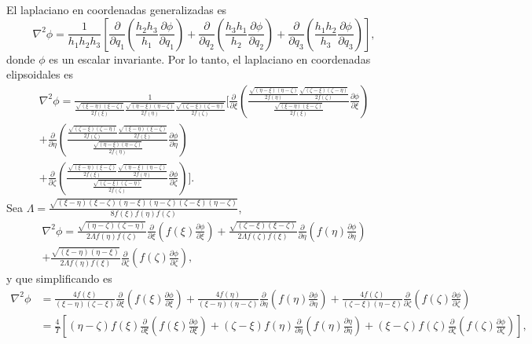 \documentclass[paper=letter, fontsize=12pt,]{article}
\begin{document}
El laplaciano en coordenadas generalizadas es \cite{Arfken}
\begin{equation}
    \nabla^2\phi=\frac{1}{h_1h_2h_3}\left[\frac{\partial}{\partial q_1}\left(\frac{h_2h_3}{h_1}\frac{\partial\phi}{\partial q_1}\right)+\frac{\partial}{\partial q_2}\left(\frac{h_3h_1}{h_2}\frac{\partial\phi}{\partial q_2}\right)+\frac{\partial}{\partial q_3}\left(\frac{h_1h_2}{h_3}\frac{\partial\phi}{\partial q_3}\right)\right],    
\end{equation}
donde $\phi$ es un escalar invariante. Por lo tanto, el laplaciano en coordenadas elipsoidales es
\begin{multline*}
    \nabla^2 \phi=\frac{1}{\frac{\sqrt{(\xi-\eta)(\xi-\zeta)}}{2f(\xi)}\frac{\sqrt{(\eta-\xi)(\eta-\zeta)}}{2f(\eta)}\frac{\sqrt{(\zeta-\xi)(\zeta-\eta)}}{2f(\zeta)}}\Bigg[\frac{\partial}{\partial\xi}\left(\frac{\frac{\sqrt{(\eta-\xi)(\eta-\zeta)}}{2f(\eta)}\frac{\sqrt{(\zeta-\xi)(\zeta-\eta)}}{2f(\zeta)}}{\frac{\sqrt{(\xi-\eta)(\xi-\zeta)}}{2f(\xi)}}\frac{\partial\phi}{\partial\xi}\right)\\+\frac{\partial}{\partial \eta}\left(\frac{\frac{\sqrt{(\zeta-\xi)(\zeta-\eta)}}{2f(\zeta)}\frac{\sqrt{(\xi-\eta)(\xi-\zeta)}}{2f(\xi)}}{\frac{\sqrt{(\eta-\xi)(\eta-\zeta)}}{2f(\eta)}}\frac{\partial\phi}{\partial\eta}\right)\\
    +\frac{\partial}{\partial \zeta}\left(\frac{\frac{\sqrt{(\xi-\eta)(\xi-\zeta)}}{2f(\xi)}\frac{\sqrt{(\eta-\xi)(\eta-\zeta)}}{2f(\eta)}}{\frac{\sqrt{(\zeta-\xi)(\zeta-\eta)}}{2f(\zeta)}}\frac{\partial\phi}{\partial\zeta}\right)\Bigg].
\end{multline*}
Sea $\Lambda=\frac{\sqrt{(\xi-\eta)(\xi-\zeta)(\eta-\xi)(\eta-\zeta)(\zeta-\xi)(\eta-\zeta)}}{8f(\xi)f(\eta)f(\zeta)}$,
\begin{multline*}
    \nabla^2\phi=\frac{\sqrt{(\eta-\zeta)(\zeta-\eta)}}{2\Lambda f(\eta)f(\zeta)}\frac{\partial}{\partial\xi}\left(f(\xi)\frac{\partial\phi}{\partial\xi}\right)+\frac{\sqrt{(\zeta-\xi)(\xi-\zeta)}}{2\Lambda f(\zeta)f(\xi)}\frac{\partial}{\partial\eta}\left(f(\eta)\frac{\partial\phi}{\partial\eta}\right)\\+\frac{\sqrt{(\xi-\eta)(\eta-\xi)}}{2\Lambda f(\eta)f(\xi)}\frac{\partial}{\partial\zeta}\left(f(\zeta)\frac{\partial\phi}{\partial\zeta}\right),
\end{multline*}
y que simplificando es
\begin{align}
    \nabla^2\phi&=\frac{4f(\xi)}{(\xi-\eta)(\zeta-\xi)}\frac{\partial}{\partial\xi}\left(f(\xi)\frac{\partial\phi}{\partial\xi}\right)+\frac{4f(\eta)}{(\xi-\eta)(\eta-\zeta)}\frac{\partial}{\partial\eta}\left(f(\eta)\frac{\partial\phi}{\partial\eta}\right)+\frac{4f(\zeta)}{(\zeta-\xi)(\eta-\xi)}\frac{\partial}{\partial\zeta}\left(f(\zeta)\frac{\partial\phi}{\partial\zeta}\right)\nonumber\\
    &=\frac{4}{\Upsilon}\left[(\eta-\zeta)f(\xi)\frac{\partial}{\partial\xi}\left(f(\xi)\frac{\partial\phi}{\partial\xi}\right)+(\zeta-\xi)f(\eta)\frac{\partial}{\partial\eta}\left(f(\eta)\frac{\partial\eta}{\partial\eta}\right)+(\xi-\zeta)f(\zeta)\frac{\partial}{\partial\zeta}\left(f(\zeta)\frac{\partial\phi}{\partial\zeta}\right)\right],
\end{align}
\end{document}
